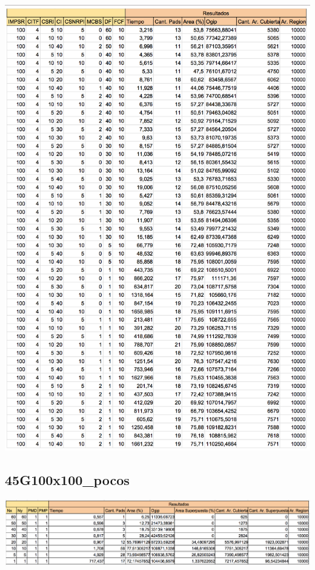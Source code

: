 \begin{center}
\includegraphics[width=1\textwidth]{imagenes/0G100x100_pocos_V2}
\end{center}

\subsection{45G100x100\_pocos}

\begin{center}
\includegraphics[width=1\textwidth]{imagenes/S_45G100x100_pocos}
\end{center}

